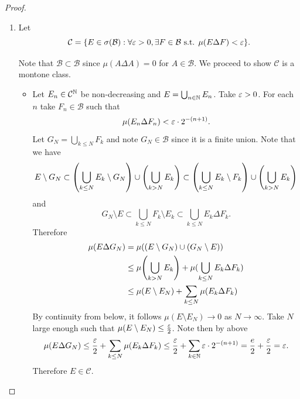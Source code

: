 \documentclass[hw_all.tex]{subfiles}
\begin{document}
\begin{proof}
    \begin{enumerate}
        \item
            Let
            \[
                \mathcal{C} = \qty{E \in \sigma(\mathcal{B}) : \forall \varepsilon> 0, \exists F \in \mathcal{B} \text{ s.t. } \mu(E \Delta F) < \varepsilon}
            .\]

            Note that $\mathcal{B} \subset \mathcal{B}$ since $\mu(A \Delta A) = 0$ for $A \in \mathcal{B}$. We proceed to show $\mathcal{C}$ is a montone class.

            \begin{itemize}
                \item
                    Let $E_n \in \mathcal{C}^{\mathbb{N}}$ be non-decreasing and $E = \bigcup_{n \in \mathbb{N}} E_n$. Take $\varepsilon > 0$. For each $n$ take $F_n \in \mathcal{B}$ such that
                    \[
                        \mu(E_n \Delta F_n) < \varepsilon \cdot 2^{-(n+1)}
                    .\]
                    Let $G_N = \bigcup_{k \leq N} F_k$ and note $G_N \in \mathcal{B}$ since it is a finite union. Note that we have
                    \[
                        E \setminus G_N \subset \qty(\bigcup_{k \leq N} E_k \setminus G_N) \cup \qty(\bigcup_{k > N} E_k) \subset \qty(\bigcup_{k \leq N} E_k \setminus F_k) \cup \qty(\bigcup_{k > N} E_k)
                    \]
                    and
                    \[
                        G_N \setminus E \subset \bigcup_{k \leq N} F_k \setminus E_k \subset \bigcup_{k \leq N} E_k \Delta F_k
                    .\]
                    Therefore
                    \begin{align*}
                        \mu(E \Delta G_N) &= \mu((E \setminus G_N) \cup (G_N \setminus E)) \\
                                          &\leq \mu\qty(\bigcup_{k > N} E_k) + \mu(\bigcup_{k \leq N} E_k \Delta F_k) \\
                                          &\leq \mu(E \setminus E_N) + \sum_{k \leq N} \mu(E_k \Delta F_k)
                    \end{align*}
                    By continuity from below, it follows $\mu(E \setminus E_N) \to 0$ as $N \to \infty$. Take $N$ large enough such that $\mu(E \setminus E_N) \leq \frac{\varepsilon}{2}$. Note then by above
                    \[
                        \mu(E \Delta G_N) \leq \frac{\varepsilon}{2} + \sum_{k \leq N} \mu(E_k \Delta F_k) \leq \frac{\varepsilon}{2} + \sum_{k \in \mathbb{N}} \varepsilon \cdot 2^{-(n+1)} = \frac{e}{2} + \frac{\varepsilon}{2} = \varepsilon
                    .\]
                    Therefore $E \in \mathcal{C}$.


\end{itemize}
\end{enumerate}
\end{proof}
\end{document}

